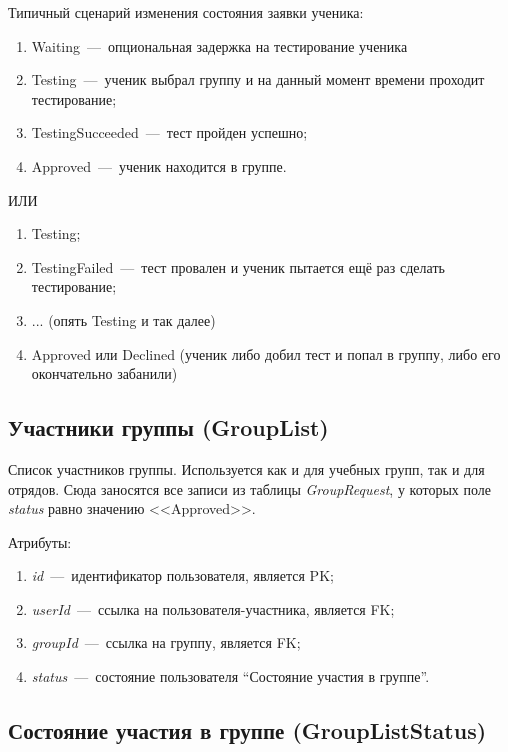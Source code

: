 \documentclass[14pt]{article}
\begin{document}
Типичный сценарий изменения состояния заявки ученика:

\begin{enumerate}
	\item Waiting~---~опциональная задержка на тестирование ученика
	\item Testing~---~ученик выбрал группу и на данный момент времени проходит тестирование;
	\item TestingSucceeded~---~тест пройден успешно;
	\item Approved~---~ученик находится в группе.
\end{enumerate}

ИЛИ

\begin{enumerate}
	\item Testing;
	\item TestingFailed~---~тест провален и ученик пытается ещё раз сделать тестирование;
	\item ... (опять Testing и так далее)
	\item Approved или Declined (ученик либо добил тест и попал в группу, либо его окончательно забанили)
\end{enumerate}

\subsection{Участники группы (GroupList)}

Список участников группы. Используется как и для учебных групп, так и для отрядов. Сюда заносятся все записи из таблицы \emph{GroupRequest}, у которых поле \emph{status} равно значению <<Approved>>.

Атрибуты:
\begin{enumerate}
	\item \emph{id}~---~идентификатор пользователя, является PK; 
	\item \emph{userId}~---~ссылка на пользователя-участника, является FK;
	\item \emph{groupId}~---~ссылка на группу, является FK;
	\item \emph{status}~---~состояние пользователя ``Состояние участия в группе''.
\end{enumerate}

\subsection{Состояние участия в группе (GroupListStatus)}
\end{document}
